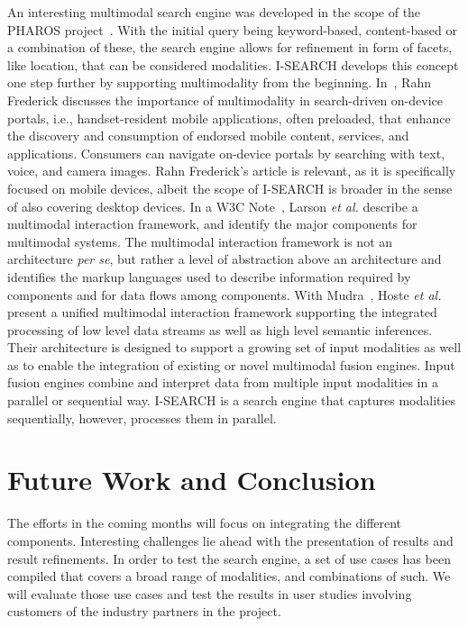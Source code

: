 \documentclass{acm_proc_article-sp}
\begin{document}
An interesting multimodal search engine was developed in the scope of the PHAROS project~\cite{pharos2009}.
With the initial query being keyword-based, content-based or a combination of these, the search engine allows for refinement in form of facets, like location, that can be considered modalities.
\mbox{I-SEARCH} develops this concept one step further by supporting multimodality from the beginning.
In~\cite{multimodalitysun}, Rahn Frederick discusses the importance of multimodality in search-driven on-device portals, i.e., handset-resident mobile applications, often preloaded, that enhance the discovery and consumption of endorsed mobile content, services, and applications.
Consumers can navigate on-device portals by searching with text, voice, and camera images.
Rahn Frederick's article is relevant, as it is specifically focused on mobile devices, albeit the scope of \mbox{I-SEARCH} is broader in the sense of also covering desktop devices. 
In a W3C Note~\cite{w3cmultimodal2003}, Larson \textit{et al.} describe a multimodal interaction framework, and identify the major components for multimodal systems.
The multimodal interaction framework is not an architecture \textit{per se}, but rather a level of abstraction above an architecture and identifies the markup languages used to describe information required by components and for data flows among components.
With Mudra~\cite{mudra2011}, Hoste \textit{et al.} present a unified multimodal interaction framework supporting the integrated processing of low level data streams as well as high level semantic inferences.
Their architecture is designed to support a growing set of input modalities as well as to enable the integration of existing or novel multimodal fusion engines.
Input fusion engines combine and interpret data from multiple input modalities in a parallel or sequential way.
\mbox{I-SEARCH} is a search engine that captures modalities sequentially, however, processes them in parallel.

\section{Future Work and Conclusion} \label{sec:futureworkconclusion}
The efforts in the coming months will focus on integrating the different components.
Interesting challenges lie ahead with the presentation of results and result refinements.
In order to test the search engine, a set of use cases has been compiled that covers a broad range of modalities, and combinations of such.
We will evaluate those use cases and test the results in user studies involving customers of the industry partners in the project.
\end{document}
